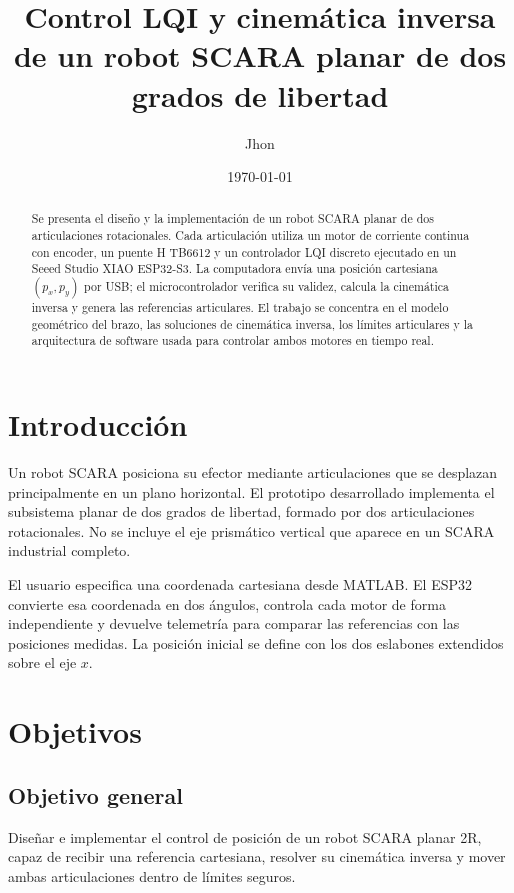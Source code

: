 \documentclass[11pt,a4paper]{article}
\title{\textbf{Control LQI y cinemática inversa de un robot SCARA planar de dos grados de libertad}}
\author{Jhon}
\date{\today}
\begin{document}
\maketitle

\begin{abstract}
Se presenta el diseño y la implementación de un robot SCARA planar de dos articulaciones rotacionales. Cada articulación utiliza un motor de corriente continua con encoder, un puente H TB6612 y un controlador LQI discreto ejecutado en un Seeed Studio XIAO ESP32-S3. La computadora envía una posición cartesiana $(p_x,p_y)$ por USB; el microcontrolador verifica su validez, calcula la cinemática inversa y genera las referencias articulares. El trabajo se concentra en el modelo geométrico del brazo, las soluciones de cinemática inversa, los límites articulares y la arquitectura de software usada para controlar ambos motores en tiempo real.
\end{abstract}

\section{Introducción}

Un robot SCARA posiciona su efector mediante articulaciones que se desplazan principalmente en un plano horizontal. El prototipo desarrollado implementa el subsistema planar de dos grados de libertad, formado por dos articulaciones rotacionales. No se incluye el eje prismático vertical que aparece en un SCARA industrial completo.

El usuario especifica una coordenada cartesiana desde MATLAB. El ESP32 convierte esa coordenada en dos ángulos, controla cada motor de forma independiente y devuelve telemetría para comparar las referencias con las posiciones medidas. La posición inicial se define con los dos eslabones extendidos sobre el eje $x$.

\section{Objetivos}

\subsection{Objetivo general}

Diseñar e implementar el control de posición de un robot SCARA planar 2R, capaz de recibir una referencia cartesiana, resolver su cinemática inversa y mover ambas articulaciones dentro de límites seguros.
\end{document}
